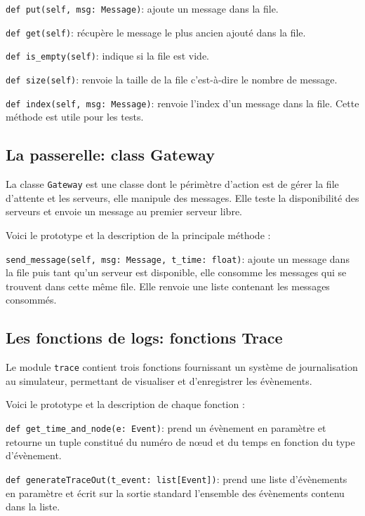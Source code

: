 \documentclass[11pt,a4paper]{article}
\begin{document}
\lstinline|def put(self, msg: Message)|: ajoute un message dans la file.

\lstinline|def get(self)|: récupère le message le plus ancien ajouté dans la file.

\lstinline|def is_empty(self)|: indique si la file est vide.

\lstinline|def size(self)|: renvoie la taille de la file c'est-à-dire le nombre de message.

\lstinline|def index(self, msg: Message)|: renvoie l'index d'un message dans la file. Cette méthode est utile pour les tests.

\bigskip

\subsection{La passerelle: class Gateway}

La classe \lstinline|Gateway| est une classe dont le périmètre d'action est de gérer la file d'attente et les serveurs, elle manipule des messages. Elle teste la disponibilité des serveurs et envoie un message au premier serveur libre.

Voici le prototype et la description de la principale méthode :

\lstinline|send_message(self, msg: Message, t_time: float)|: ajoute un message dans la file puis tant qu'un serveur est disponible, elle consomme les messages qui se trouvent dans cette même file. Elle renvoie une liste contenant les messages consommés.

\bigskip

\subsection{Les fonctions de logs: fonctions Trace}

Le module \lstinline|trace| contient trois fonctions fournissant un système de journalisation au simulateur, permettant de visualiser et d'enregistrer les évènements.

Voici le prototype et la description de chaque fonction :

\lstinline|def get_time_and_node(e: Event)|:  prend un évènement en paramètre et retourne un tuple constitué du numéro de nœud et du temps en fonction du type d'évènement.

\lstinline|def generateTraceOut(t_event: list[Event])|:  prend une liste d'évènements en paramètre et écrit sur la sortie standard l'ensemble des évènements contenu dans la liste.
\end{document}
